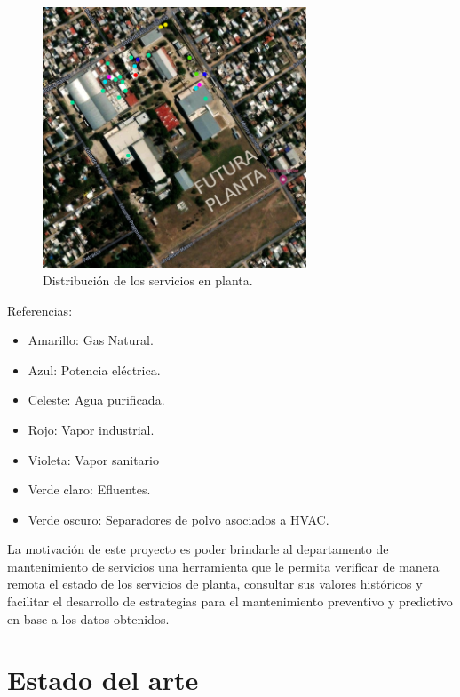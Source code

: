 \begin{figure}[htbp]
	\centering
	\includegraphics[width=0.7\textwidth]{./Figures/ROEMMERS.png}
	\caption{Distribución de los servicios en planta.}
	\label{fig:LG}
\end{figure}
Referencias:
\begin{itemize}
	\item Amarillo: Gas Natural.
	\item Azul: Potencia eléctrica.
	\item Celeste: Agua purificada.
	\item Rojo: Vapor industrial.
	\item Violeta: Vapor sanitario
	\item Verde claro: Efluentes.
	\item Verde oscuro: Separadores de polvo asociados a HVAC.
\end{itemize}

La motivación de este proyecto es poder brindarle al departamento de mantenimiento de servicios una herramienta que le permita verificar de manera remota el estado de los servicios de planta, consultar sus valores históricos y facilitar el desarrollo de estrategias para el mantenimiento preventivo y predictivo en base a los datos obtenidos.%


\section{Estado del arte}

